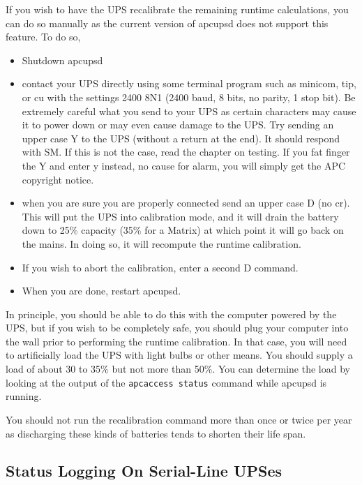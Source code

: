 {{{{{{{If you wish to have the UPS recalibrate the remaining runtime calculations,
you can do so manually as the current version of apcupsd does not support this
feature. To do so,  

\begin{itemize}
\item Shutdown apcupsd  
\item contact your UPS directly using some terminal program such as minicom,
   tip, or cu with the settings 2400 8N1 (2400 baud, 8 bits, no parity, 1 stop
   bit). Be extremely careful what you send to your UPS as certain characters may
cause it to power down or may even cause damage to the UPS. Try sending an
upper case Y to the UPS (without a return at the end). It should respond with
SM. If this is not the case, read the chapter on testing. If you fat finger
the Y and enter y instead, no cause for alarm, you will simply get the APC
copyright notice.  
\item when you are sure you are properly connected send an upper case D (no
   cr). This will put the UPS into calibration mode, and it will drain the
   battery down to 25\% capacity (35\% for a Matrix) at which point it will go
back on the mains. In doing so, it will recompute the runtime calibration.  
\item If you wish to abort the calibration, enter a second D command.  
\item When you are done, restart apcupsd. 
   \end{itemize}

In principle, you should be able to do this with the computer powered by the
UPS, but if you wish to be completely safe, you should plug your computer into
the wall prior to performing the runtime calibration. In that case, you will
need to artificially load the UPS with light bulbs or other means. You should
supply a load of about 30 to 35\% but not more than 50\%. You can determine
the load by looking at the output of the {\tt apcaccess status} command while
apcupsd is running.  

You should not run the recalibration command more than once or twice per year
as discharging these kinds of batteries tends to shorten their life span. 

\label{Status-Logging-On-Serial_002dLine-UPSes}

\subsection*{Status Logging On Serial-Line UPSes}

}}}}}}}
